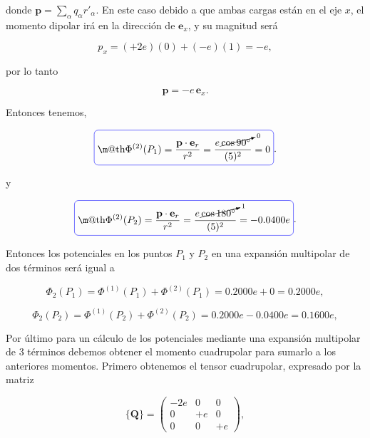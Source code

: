 \documentclass[a4paper,11pt]{article}
\makeatletter
\numberwithin{equation}{section}
\newcommand*{\boxcolor}{blue}
\renewcommand{\boxed}[1]{\textcolor{\boxcolor}{%
\tikz[baseline={([yshift=-1ex]current bounding box.center)}] \node [rectangle, minimum width=1ex,rounded corners,draw] {\normalcolor\m@th$\displaystyle#1$};}}
\makeatother
\begin{document}
donde $\mathbf{p} = \sum_\alpha q_\alpha r'_\alpha$. En este caso debido a que 
ambas cargas están en el eje $x$, el momento dipolar irá en la dirección de 
$ \mathbf{e}_x$, y su magnitud será 

\begin{equation}
 p_x = (+2e)(0) + (-e)(1) = -e,
\end{equation}

por lo tanto 

\begin{equation}
 \mathbf{p} = -e \, \mathbf{e}_x.
\end{equation}

Entonces tenemos, 

\begin{equation}
 \boxed{\Phi^{(2)}(P_1) = \frac{\mathbf{p}\cdot \mathbf{e}_r}{r^2} = 
 \frac{e \, \cancelto{0}{\cos{90^\circ}}}{(5)^2} = 0}.
\end{equation}

y 

\begin{equation}
 \boxed{\Phi^{(2)}(P_2) = \frac{\mathbf{p}\cdot \mathbf{e}_r}{r^2} = 
 \frac{e \,\cancelto{1}{\cos{180^\circ}}}{(5)^2} = - 0.0400e}.
\end{equation}

Entonces los potenciales en los puntos $P_1$ y $P_2$ en una expansión multipolar de 
dos términos será igual a 

\begin{equation}
 \Phi_2(P_1) = \Phi^{(1)}(P_1) + \Phi^{(2)}(P_1) = 0.2000 e + 0 = 0.2000 e,
\end{equation}

\begin{equation}
 \Phi_2(P_2) = \Phi^{(1)}(P_2) + \Phi^{(2)}(P_2) = 0.2000 e - 0.0400e = 0.1600 e,
\end{equation}

Por último para un cálculo de los potenciales mediante una expansión multipolar de 
3 términos debemos obtener el momento cuadrupolar para sumarlo a los anteriores 
momentos. Primero obtenemos el tensor cuadrupolar, expresado por la matriz 

\begin{equation}
 \{ \mathbf{Q} \} = \begin{pmatrix}
                     -2e & 0 & 0 \\
                     0 & +e & 0 \\
                     0 & 0 & +e
                    \end{pmatrix},
\end{equation}
\end{document}
